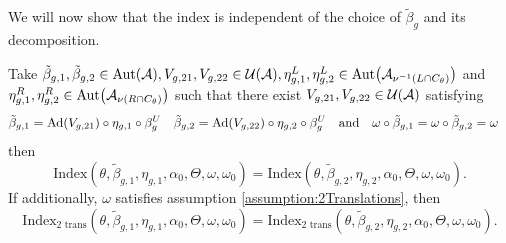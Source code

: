 \documentclass[11pt,a4paper,twoside]{article}
\numberwithin{equation}{section}
\begin{document}
	We will now show that the index is independent of the choice of $\tilde{\beta}_g$ and its decomposition.
	\begin{lemma}\label{lem:InvarianceUnderChoiceBeta}
		Take $\tilde{\beta}_{g,1},\tilde{\beta}_{g,2}\in\Aut{\AA},V_{g,21},V_{g,22}\in\UU(\AA),\eta_{g,1}^L,\eta_{g,2}^L\in \Aut{\AA_{\nu^{-1}(L\cap C_\theta)}}$ and $\eta_{g,1}^R,\eta_{g,2}^R\in \Aut{\AA_{\nu(R\cap C_\theta)}}$ such that there exist $V_{g,21},V_{g,22}\in\mathcal U(\mathcal A)$ satisfying
		\begin{align}\label{eq:InvarianceUnderChoiceBetaTwoBetas}
			\tilde{\beta}_{g,1}&=\Ad{V_{g,21}}\circ\eta_{g,1}\circ\beta^U_g&\tilde{\beta}_{g,2}&=\Ad{V_{g,22}}\circ\eta_{g,2}\circ\beta^U_g&&\text{and}&\omega\circ\tilde{\beta}_{g,1}&=\omega\circ\tilde{\beta}_{g,2}=\omega
		\end{align}then
		\begin{equation}
			\textrm{Index}(\theta,\tilde{\beta}_{g,1},\eta_{g,1},\alpha_{0},\Theta,\omega,\omega_0)=\textrm{Index}(\theta,\tilde{\beta}_{g,2},\eta_{g,2},\alpha_{0},\Theta,\omega,\omega_0).
		\end{equation}
		If additionally, $\omega$ satisfies assumption \ref{assumption:2Translations},	then
		\begin{equation}
			\textrm{Index}_{\text{2 trans}}(\theta,\tilde{\beta}_{g,1},\eta_{g,1},\alpha_{0},\Theta,\omega,\omega_0)=\textrm{Index}_{\text{2 trans}}(\theta,\tilde{\beta}_{g,2},\eta_{g,2},\alpha_{0},\Theta,\omega,\omega_0).
		\end{equation}
	\end{lemma}
\end{document}
